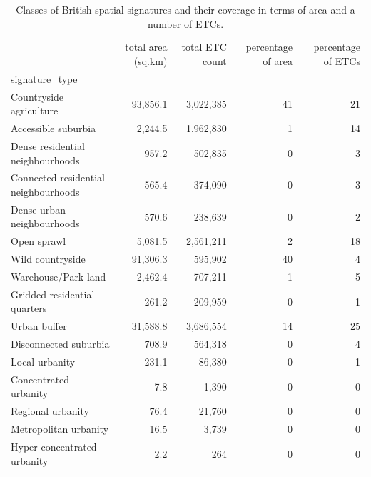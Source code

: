 \begin{table}
\begin{tabular}{lrrrr}
    \toprule
    {} &        total area (sq.km) &  total ETC count &  percentage of area &
    percentage of ETCs \\
    signature\_type                       &             &         &            &
    \\
    \midrule
    Countryside agriculture              & 93,856.1 & 3,022,385 &         41 &
    21 \\
    Accessible suburbia                  &  2,244.5 & 1,962,830 &          1 &
    14 \\
    Dense residential neighbourhoods     &    957.2 &   502,835 &          0 &
    3 \\
    Connected residential neighbourhoods &    565.4 &   374,090 &          0 &
    3 \\
    Dense urban neighbourhoods           &    570.6 &   238,639 &          0 &
    2 \\
    Open sprawl                          &  5,081.5 & 2,561,211 &          2 &
    18 \\
    Wild countryside                     & 91,306.3 &   595,902 &         40 &
    4 \\
    Warehouse/Park land                  &  2,462.4 &   707,211 &          1 &
    5 \\
    Gridded residential quarters         &    261.2 &   209,959 &          0 &
    1 \\
    Urban buffer                         & 31,588.8 & 3,686,554 &         14 &
    25 \\
    Disconnected suburbia                &    708.9 &   564,318 &          0 &
    4 \\
    Local urbanity                       &    231.1 &    86,380 &          0 &
    1 \\
    Concentrated urbanity                &      7.8 &     1,390 &          0 &
    0 \\
    Regional urbanity                    &     76.4 &    21,760 &          0 &
    0 \\
    Metropolitan urbanity                &     16.5 &     3,739 &          0 &
    0 \\
    Hyper concentrated urbanity          &      2.2 &       264 &          0 &
    0 \\
    \bottomrule
\end{tabular}
    \caption{\label{tab:sig_types}Classes of British spatial signatures and their
    coverage in terms of area and a number of ETCs.}
\end{table}




